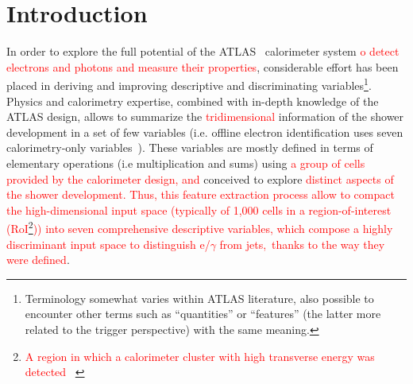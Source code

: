 \chapter{Introduction}



In order to explore the full potential of the ATLAS~\cite{PERF-2007-01}
calorimeter system \textcolor{red}{o detect electrons
and photons and measure their properties}, considerable effort has been placed in deriving and
improving descriptive and discriminating variables\footnote{Terminology somewhat
  varies within ATLAS literature, also possible to encounter other terms such
as ``quantities'' or ``features'' (the latter more related to the trigger
perspective) with the same meaning.}. Physics and calorimetry expertise,
combined with in-depth knowledge of the ATLAS design, allows to summarize the \textcolor{red}{tridimensional} information of the shower development in a set of few
variables (i.e. offline electron identification uses seven calorimetry-only
variables~\cite{aaboud2019electron}). These variables are mostly defined in
terms of elementary operations (i.e multiplication and sums) using \textcolor{red}{a group of cells provided by the calorimeter
design, and} conceived to explore
\textcolor{red}{distinct aspects of the shower development. Thus, this feature extraction process allow to
compact the high-dimensional input space (typically of 1,000 cells in a region-of-interest (RoI\textcolor{red}{\footnote{\textcolor{red}{A region in which a calorimeter cluster with high transverse energy was detected ~\cite{CERN-LHCC-2017-020}}}})) into seven comprehensive descriptive variables, which compose a highly discriminant input space to distinguish e/$\gamma$ from jets, thanks to the way they were defined}.


